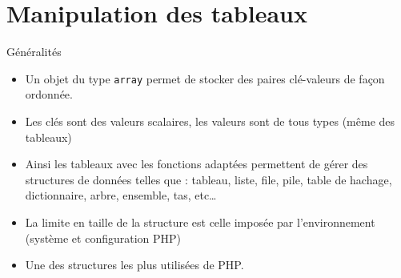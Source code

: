 
\section{Manipulation des tableaux}

\begin{frame}{Généralités}
	\begin{itemize}
		\item Un objet du type \texttt{array} permet de stocker des paires clé-valeurs de façon ordonnée.
		\item Les clés sont des valeurs scalaires, les valeurs sont de tous types (même des tableaux)
		\item Ainsi les tableaux avec les fonctions adaptées permettent de gérer des structures de données telles que : tableau, liste, file, pile, table de hachage, dictionnaire, arbre, ensemble, tas, etc\ldots
		\item La limite en taille de la structure est celle imposée par l’environnement (système et configuration PHP)
		\item Une des structures les plus utilisées de PHP.
	\end{itemize}
\end{frame}

